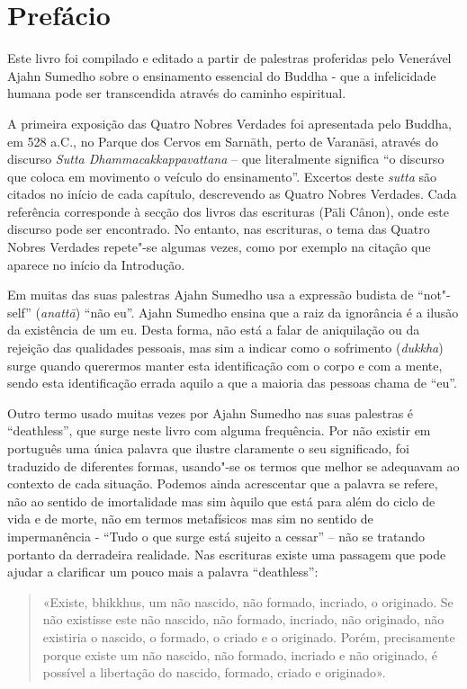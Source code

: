 \chapter{Prefácio}

\thispagestyle{bottomcenter}

Este livro foi compilado e editado a partir de palestras proferidas pelo
Venerável Ajahn Sumedho sobre o ensinamento essencial do Buddha - que a
infelicidade humana pode ser transcendida através do caminho espiritual.

A primeira exposição das Quatro Nobres Verdades foi apresentada pelo Buddha, em
528 a.C., no Parque dos Cervos em Sarnāth, perto de Varanāsi, através do
discurso \emph{Sutta Dhammacakkappavattana} – que literalmente
significa “o discurso que coloca em movimento o veículo do ensinamento”.
Excertos deste \emph{sutta} são citados no início de cada capítulo, descrevendo
as Quatro Nobres Verdades. Cada referência corresponde à secção dos livros das
escrituras (Pāli Cânon), onde este discurso pode ser encontrado. No entanto, nas
escrituras, o tema das Quatro Nobres Verdades repete"-se algumas vezes, como por
exemplo na citação que aparece no início da Introdução.

Em muitas das suas palestras Ajahn Sumedho usa a expressão budista de “not"-self”
(\emph{anattā}) “não eu”. Ajahn Sumedho ensina que a raiz da ignorância é a
ilusão da existência de um eu. Desta forma, não está a falar de aniquilação ou
da rejeição das qualidades pessoais, mas sim a indicar como o sofrimento
(\emph{dukkha}) surge quando querermos manter esta identificação com o corpo e
com a mente, sendo esta identificação errada aquilo a que a maioria das
pessoas chama de “eu”.

Outro termo usado muitas vezes por Ajahn Sumedho nas suas palestras é
“deathless”, que surge neste livro com alguma frequência. Por não existir em
português uma única palavra que ilustre claramente o seu significado, foi
traduzido de diferentes formas, usando"-se os termos que melhor se adequavam ao
contexto de cada situação. Podemos ainda acrescentar que a palavra se refere,
não ao sentido de imortalidade mas sim àquilo que está para além do ciclo de
vida e de morte, não em termos metafísicos mas sim no sentido de impermanência -
“Tudo o que surge está sujeito a cessar” – não se tratando portanto da
derradeira realidade. Nas escrituras existe uma passagem que pode ajudar a
clarificar um pouco mais a palavra “deathless”:

\begin{quote}
  «Existe, bhikkhus, um não nascido, não formado, incriado, o originado. 
  Se não existisse este não nascido, não formado, incriado, não
  originado, não existiria o nascido, o formado, o criado e o originado. Porém,
  precisamente porque existe um não nascido, não formado, incriado e não
  originado, é possível a libertação do nascido, formado, criado e originado».

\end{quote}


